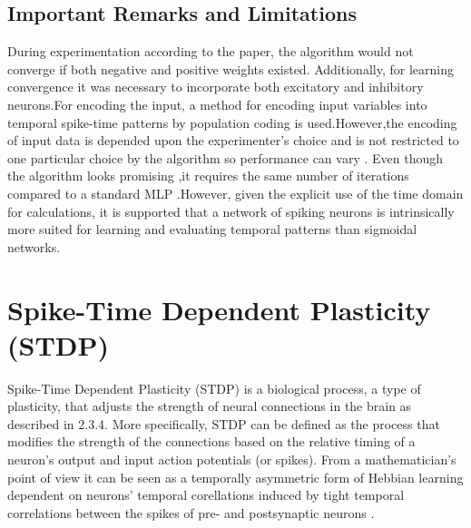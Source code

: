 \documentclass[12pt]{report}
\begin{document}
\subsection{Important Remarks and Limitations}
During experimentation according to the paper, the algorithm would not converge if both negative and positive weights existed. Additionally, for learning convergence it was necessary to incorporate both excitatory and inhibitory neurons.For encoding the input, a method for encoding input variables into temporal spike-time patterns by population coding is used.However,the encoding of input data is depended upon the experimenter's choice and is not restricted to one particular choice by the algorithm so performance can vary . Even though the algorithm looks promising ,it requires the same number of iterations compared to a standard MLP .However, given the explicit use of the time domain for calculations, it is supported that a network of spiking neurons is intrinsically more suited for learning and evaluating temporal patterns than sigmoidal networks.
\section{Spike-Time Dependent Plasticity (STDP)}
Spike-Time Dependent Plasticity (STDP)  is a biological process, a type of plasticity, that adjusts the strength of neural connections in the brain as described in 2.3.4. More specifically, STDP can be defined as the process that modifies the strength of the connections based on the relative timing of a neuron's output and input action potentials (or spikes). From a mathematician's point of view it can be seen as a temporally asymmetric form of Hebbian learning dependent on neurons' temporal corellations  induced by tight temporal correlations between the spikes of pre- and postsynaptic neurons \cite{stdp2010} . 
\end{document}
